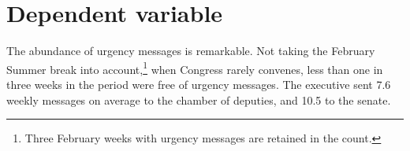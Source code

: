 \documentclass[letter,12pt]{article}
\begin{document}
\section{Dependent variable}

The abundance of urgency messages is remarkable. Not taking the February Summer break into account,\footnote{Three February weeks with urgency messages are retained in the count.} when Congress rarely convenes, less than one in three weeks in the period were free of urgency messages. The executive sent 7.6 weekly messages on average to the chamber of deputies, and 10.5 to the senate.

\end{document}
